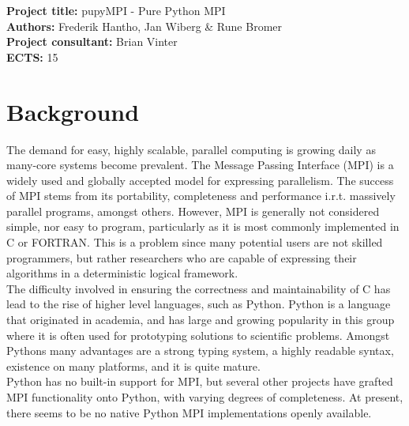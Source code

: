 \documentclass{article}
\begin{document}
\pagestyle{fancy}

\setlength\headheight{2cm}

\noindent
\textbf{Project title:} pupyMPI - Pure Python MPI\\

\noindent
\textbf{Authors:} Frederik Hantho, Jan Wiberg \& Rune Bromer\\

\noindent
\textbf{Project consultant:} Brian Vinter\\

\noindent
\textbf{ECTS:} 15\\


\section*{Background}
The demand for easy, highly scalable, parallel computing is growing daily as
many-core systems become prevalent. The Message Passing Interface (MPI) is a
widely used and globally accepted model for expressing parallelism. The success
of MPI stems from its portability, completeness and performance i.r.t. massively
parallel programs, amongst others. However, MPI is generally not considered
simple, nor easy to program, particularly as it is most commonly implemented in
C or FORTRAN. This is a problem since many potential users are not skilled
programmers, but rather researchers who are capable of expressing their
algorithms in a deterministic logical framework.
\\

The difficulty involved in ensuring the correctness and maintainability of C has
lead to the rise of higher level languages, such as Python. Python is a
language that originated in academia, and has large and growing popularity in
this group where it is often used for prototyping solutions to scientific
problems. Amongst Pythons many advantages are a strong typing system, a highly
readable syntax, existence on many platforms, and it is quite mature.
\\

Python has no built-in support for MPI, but several other projects have grafted
MPI functionality onto Python, with varying degrees of completeness. At present,
there seems to be no native Python MPI implementations openly available.
\end{document}
